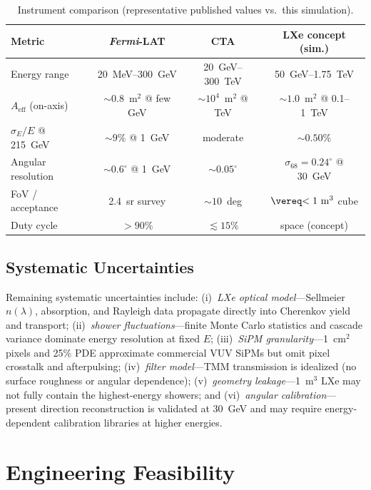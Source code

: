\documentclass{aastex701}
\begin{document}
\begin{table}[htbp]
\centering
\caption{Instrument comparison (representative published values vs.\ this simulation).}
\label{tab:instrument_compare}
\begin{tabular}{lccc}
\toprule
Metric & \textit{Fermi}-LAT & CTA & LXe concept (sim.) \\
\midrule
Energy range & 20~MeV--300~GeV & 20~GeV--300~TeV & 50~GeV--1.75~TeV\tablenotemark{a} \\
$A_\mathrm{eff}$ (on-axis) & $\sim 0.8$~m$^2$ @ few GeV & $\sim 10^4$~m$^2$ @ TeV & $\sim 1.0$~m$^2$ @ 0.1--1~TeV \\
$\sigma_E/E$ @ 215~GeV & $\sim 9\%$ @ 1~GeV & moderate & $\sim 0.50\%$ \\
Angular resolution & $\sim 0.6^\circ$ @ 1~GeV & $\sim 0.05^\circ$ & $\sigma_{68}=0.24^\circ$ @ 30~GeV \\
FoV / acceptance & 2.4~sr survey & $\sim 10$~deg & $\lesssim 1~{\rm m}^3$ cube \\
Duty cycle & $>90\%$ & $\lesssim 15\%$ & space (concept) \\
\bottomrule
\end{tabular}
\end{table}

\subsection{Systematic Uncertainties}

Remaining systematic uncertainties include: (i)~\textit{LXe optical model}---Sellmeier $n(\lambda)$, absorption, and Rayleigh data propagate directly into Cherenkov yield and transport; (ii)~\textit{shower fluctuations}---finite Monte Carlo statistics and cascade variance dominate energy resolution at fixed $E$; (iii)~\textit{SiPM granularity}---1~cm$^2$ pixels and 25\% PDE approximate commercial VUV SiPMs but omit pixel crosstalk and afterpulsing; (iv)~\textit{filter model}---TMM transmission is idealized (no surface roughness or angular dependence); (v)~\textit{geometry leakage}---1~m$^3$ LXe may not fully contain the highest-energy showers; and (vi)~\textit{angular calibration}---present direction reconstruction is validated at 30~GeV and may require energy-dependent calibration libraries at higher energies.

\section{Engineering Feasibility}\label{sec:feasibility} 
\end{document}
